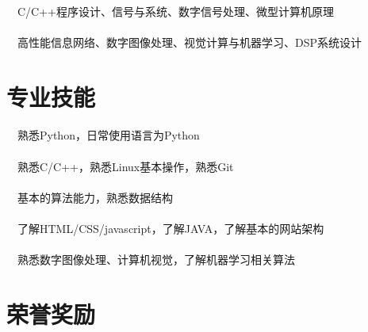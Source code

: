 \documentclass[12pt,a4paer]{article}
\begin{document}
\begin{CJK}{UTF8}{gbsn}
  \paragraph{}\textit{\textbullet}~~C/C++程序设计、信号与系统、数字信号处理、微型计算机原理\vspace{-1.5em}
   \paragraph{}\textit{\textbullet}~~高性能信息网络、数字图像处理、视觉计算与机器学习、DSP系统设计\vspace{-1.8em}
 

\section*{{\large 专业技能}}
 \vspace{-0.8em}
  \paragraph{}\textit{\textbullet}~~熟悉Python，日常使用语言为Python\vspace{-1.5em}
   \paragraph{}\textit{\textbullet}~~熟悉C/C++，熟悉Linux基本操作，熟悉Git\vspace{-1.5em}
    \paragraph{}\textit{\textbullet}~~基本的算法能力，熟悉数据结构\vspace{-1.5em}
     \paragraph{}\textit{\textbullet}~~了解HTML/CSS/javascript，了解JAVA，了解基本的网站架构\vspace{-1.5em}
      \paragraph{}\textit{\textbullet}~~熟悉数字图像处理、计算机视觉，了解机器学习相关算法\vspace{-1.5em}
  \section*{{\large 荣誉奖励}}
  \vspace{-0.8em} %

\end{CJK}
\end{document}
